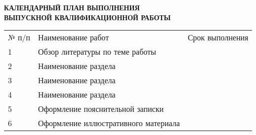 \begin{center}
	\textbf{
		КАЛЕНДАРНЫЙ ПЛАН ВЫПОЛНЕНИЯ \\
		ВЫПУСКНОЙ КВАЛИФИКАЦИОННОЙ РАБОТЫ
	}

	\vspace*{2cm}

	\confirmation

	\vspace*{3cm}
	
	\worktitle

	\vspace*{4cm}
	
	\begin{tabularx}{\textwidth}{ l X l }
		№ п/п & Наименование работ & Срок выполнения \\
		1 & Обзор литературы по теме работы & \\
		2 & Наименование раздела & \\
		3 & Наименование раздела & \\
		4 & Наименование раздела & \\
		5 & Оформление пояснительной записки & \\
		6 & Оформление иллюстративного материала & \\
	\end{tabularx}

	\vspace*{4cm}

	\subsblock
\end{center}

\thispagestyle{empty}
\clearpage

